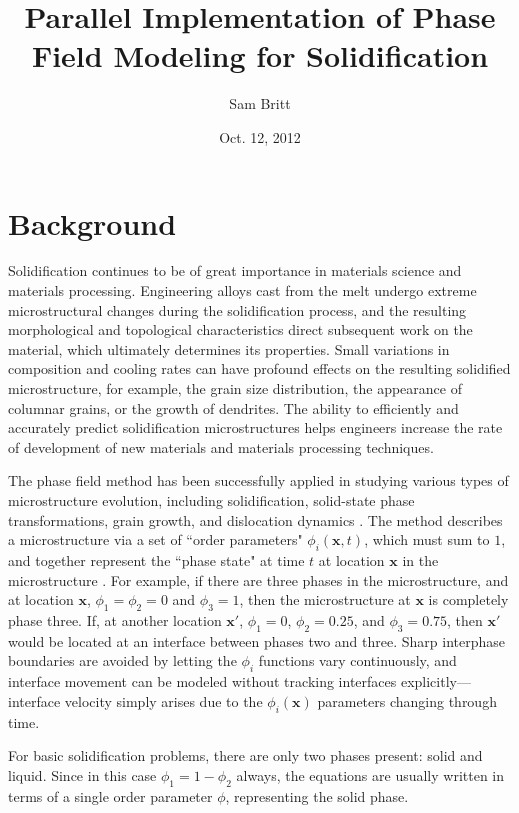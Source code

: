 \documentclass{article}
\title{Parallel Implementation of Phase Field Modeling for Solidification}
\author{Sam Britt}
\date{Oct. 12, 2012}
\renewcommand\vec[1]{\bm{#1}}
\begin{document}
  \maketitle
  \thispagestyle{empty}

  \section{Background}
  \label{sec:background}

  Solidification continues to be of great importance in materials
  science and materials processing. Engineering alloys cast from the
  melt undergo extreme microstructural changes during the
  solidification process, and the resulting morphological and
  topological characteristics direct subsequent work on the material,
  which ultimately determines its properties. Small variations in
  composition and cooling rates can have profound effects on the
  resulting solidified microstructure, for example, the grain size
  distribution, the appearance of columnar grains, or the growth of
  dendrites. The ability to efficiently and accurately predict
  solidification microstructures helps engineers increase the rate of
  development of new materials and materials processing techniques.

  The phase field method has been successfully applied in studying
  various types of microstructure evolution, including solidification,
  solid-state phase transformations, grain growth, and dislocation
  dynamics \cite{Chen2002}. The method describes a microstructure via
  a set of ``order parameters" $\phi_i(\vec{x}, t)$, which must sum to
  $1$, and together represent the ``phase state" at time $t$ at
  location $\vec x$ in the microstructure \cite{Ode2001}.  For
  example, if there are three phases in the microstructure, and at
  location $\vec{x}$, $\phi_1 = \phi_2 = 0$ and $\phi_3 = 1$, then the
  microstructure at $\vec x$ is completely phase three. If, at another
  location $\vec x'$, $\phi_1 = 0$, $\phi_2 = 0.25$, and $\phi_3 =
  0.75$, then $\vec x'$ would be located at an interface between
  phases two and three. Sharp interphase boundaries are avoided by
  letting the $\phi_i$ functions vary continuously, and interface
  movement can be modeled without tracking interfaces
  explicitly---interface velocity simply arises due to the $\phi_i(\vec
  x)$ parameters changing through time.

  For basic solidification problems, there are only two phases
  present: solid and liquid. Since in this case $\phi_1 = 1 - \phi_2$
  always, the equations are usually written in terms of a single order
  parameter $\phi$, representing the solid phase.
\end{document}
